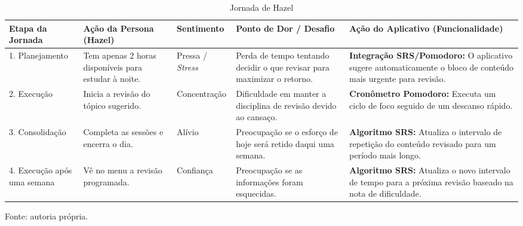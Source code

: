 \begin{table}[H]
\centering
\caption{Jornada de Hazel}
\label{tab:jornada_hazel}
\begin{tabular}{|p{2.5cm}|p{2.5cm}|p{2.8cm}|p{3cm}|p{3.5cm}|}
\hline
\textbf{Etapa da Jornada} & \textbf{Ação da Persona (Hazel)} & \textbf{Sentimento} & \textbf{Ponto de Dor / Desafio} & \textbf{Ação do Aplicativo (Funcionalidade)} \\ \hline
1. Planejamento & Tem apenas 2 horas disponíveis para estudar à noite. & Pressa / \textit{Stress} & Perda de tempo tentando decidir o que revisar para maximizar o retorno. & \textbf{Integração SRS/Pomodoro:} O aplicativo sugere automaticamente o bloco de conteúdo mais urgente para revisão. \\ \hline
2. Execução & Inicia a revisão do tópico sugerido. & Concentração & Dificuldade em manter a disciplina de revisão devido ao cansaço. & \textbf{Cronômetro Pomodoro:} Executa um ciclo de foco seguido de um descanso rápido. \\ \hline
3. Consolidação & Completa as sessões e encerra o dia. & Alívio & Preocupação se o esforço de hoje será retido daqui uma semana. & \textbf{Algoritmo SRS:} Atualiza o intervalo de repetição do conteúdo revisado para um período mais longo. \\ \hline
4. Execução após uma semana & Vê no menu a revisão programada. & Confiança & Preocupação se as informações foram esquecidas. & \textbf{Algoritmo SRS:} Atualiza o novo intervalo de tempo para a próxima revisão baseado na nota de dificuldade. \\ \hline
\end{tabular}
\par
\vspace{0.5em}
\small Fonte: autoria própria.
\end{table}

